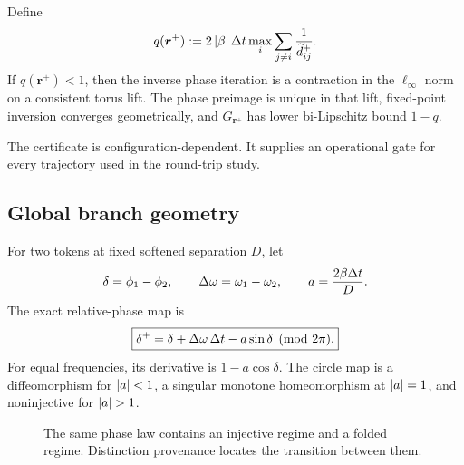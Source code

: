 \begin{theorem}
\label{thm:phase-certificate}
Define
\begin{equation}
q(\bm r^+)
:=
2\left\lvert \beta\right\rvert\Delta t
\max_i\sum_{j\neq i}
\frac{1}{\widetilde d_{ij}^{+}}.
\label{eq:q}
\end{equation}
If \(q(\bm r^+)<1\), then the inverse phase iteration is a contraction in the \(\ell_\infty\) norm on a consistent torus lift. The phase preimage is unique in that lift, fixed-point inversion converges geometrically, and \(G_{\bm r^+}\) has lower bi-Lipschitz bound \(1-q\).
\end{theorem}

The certificate is configuration-dependent. It supplies an operational gate for every trajectory used in the round-trip study.

\subsection{Global branch geometry}

For two tokens at fixed softened separation \(D\), let
\[
\delta=\phi_1-\phi_2,
\qquad
\Delta\omega=\omega_1-\omega_2,
\qquad
a=\frac{2\beta\Delta t}{D}.
\]
The exact relative-phase map is
\begin{equation}
\boxed{
\delta^+
=
\delta+\Delta\omega\,\Delta t-a\sin\delta
\pmod{2\pi}.
}
\label{eq:two-clock}
\end{equation}
For equal frequencies, its derivative is \(1-a\cos\delta\). The circle map is a diffeomorphism for \(\left\lvert a\right\rvert<1\), a singular monotone homeomorphism at \(\left\lvert a\right\rvert=1\), and noninjective for \(\left\lvert a\right\rvert>1\).

\begin{figure}[H]
\centering
{}
\caption{The same phase law contains an injective regime and a folded regime. Distinction provenance locates the transition between them.}
\label{fig:phase-fold}
\end{figure}

